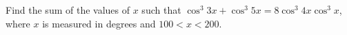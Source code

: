 Find the sum of the values of $x$ such that $\cos^3 3x+ \cos^3 5x = 8 \cos^3 4x \cos^3 x$, where $x$ is measured in degrees and $100< x< 200$.